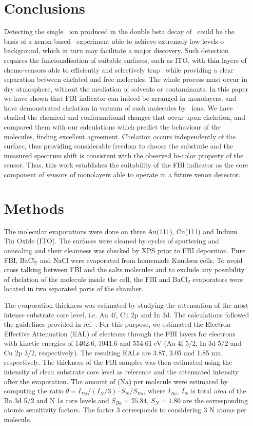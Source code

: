 \documentclass[aps,prl,reprint,longbibliography,superscriptaddress, english]{revtex4-1}
\def\BappCl{BaCl$_2$ }
\begin{document}
\section{Conclusions}
Detecting the single \Bapp\ ion produced in the double beta decay of \XE\ could be the basis of a xenon-based \bbonu\ experiment able to achieve extremely low levels o background, which in turn may facilitate a major discovery. Such detection requires the funcionalisation of suitable surfaces, such as ITO, with thin layers of chemo-sensors able to efficiently and selectively trap \Bapp\ while providing a clear separation between chelated and free molecules. The whole process must occur in dry atmosphere, without the mediation of solvents or contaminants. In this paper we have shown that FBI indicator can indeed be arranged in monolayers, and have demonstrated chelation in vacuum of such molecules by \Bapp\ ions. We have studied the chemical and conformational changes that occur upon chelation, and compared them with our calculations which predict the behaviour of the molecules, finding excellent agreement. Chelation occurs independently of the surface, thus providing considerable freedom to choose the substrate and the measured spectrum shift is consistent with the observed bi-color property of the sensor. Thus, this work establishes the suitability of the FBI indicator as the core component of sensors of monolayers able to operate in a future xenon detector. 

\section{Methods}

 The molecular evaporations were done on three Au(111), Cu(111) and Indium Tin Oxide (ITO). The surfaces were cleaned by cycles of sputtering and annealing and their cleanness was checked by XPS prior to FBI deposition. Pure FBI, \BappCl and NaCl were evaporated from homemade Knudsen cells. To avoid cross talking between FBI and the salts molecules and to exclude any possibility of chelation of the molecule inside the cell, the FBI and \BappCl  evaporators were located in two separated parts of the chamber.
 
The evaporation thickness was estimated by studying the attenuation of the most intense substrate core level, i.e. Au 4f, Cu 2p and In 3d. The calculations followed the guidelines provided in ref. \cite{powell_practical_2020}. For this purpose, we estimated the Electron Effective Attenuation (EAL) of electrons through the FBI layers for electrons with kinetic energies of 1402.6, 1041.6 and 554.61 eV (Au 4f 5/2, In 3d 5/2 and Cu 2p 3/2, respectively). The resulting EALs are 3.87, 3.05 and 1.85 nm, respectively. The thickness of the FBI samples was then estimated using the intensity of clean substrate core level as reference and the attenuated intensity after the evaporation. The amount of \Bapp (Na) per molecule were estimated by computing  the ratio $\theta=I_{Ba}/(I_N/3) \cdot S_N/S_{Ba} $, where $I_{Ba}$, $I_N$ is total area  of the  Ba 3d 5/2 and  N 1s  core  levels and $S_{Ba} = 25.84$, $S_N = 1.80$ are the corresponding atomic sensitivity factors\cite{scofield_hartree-slater_1976}. The factor 3 corresponds to considering 3 N atoms per molecule.
\end{document}

